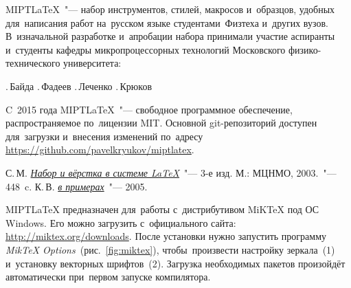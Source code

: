 \begingroup
\let\cleardoublepage\clearpage
\tableofcontents
\endgroup


MIPT\LaTeX~"--- набор инструментов, стилей, макросов и~образцов, удобных для~написания работ на~русском языке студентами~Физтеха и~других вузов.
В~изначальной разработке и~апробации набора принимали участие аспиранты и~студенты кафедры микропроцессорных технологий Московского физико-технического университета:
\begin{itemize}
    .\,Байда
    .\,Фадеев
    .\,Леченко
    .\,Крюков
\end{itemize}

C~2015 года MIPT\LaTeX~"--- свободное программное обеспечение, распространяемое по~лицензии MIT.
Основной git-репозиторий доступен для~загрузки и~внесения изменений по~адресу \url{https://github.com/pavelkryukov/miptlatex}.

\pagebreak


\begin{enumerate}[label = \arabic*.]
     С.\,М. \emph{\href{http://www.ihed.ras.ru/subsecond2007/papers/lv3ed.pdf}{Набор и вёрстка в системе \LaTeX}}~"--- 3-е изд. М.: МЦНМО, 2003.~"---448~c.
		 К.\,В. \emph{\href{http://www.ccas.ru/voron/download/voron05latex.pdf}{\LaTeXe в примерах}}~"--- 2005.
\end{enumerate}


MIPT\LaTeX{} предназначен для~работы с~дистрибутивом MiKTeX под ОС Windows.
Его можно загрузить с~официального сайта: \url{http://miktex.org/downloads}.
После установки нужно запустить программу \emph{MikTeX Options}~(рис.~\ref{fig:miktex}), чтобы~произвести настройку зеркала~(1) и~установку векторных шрифтов~(2).
Загрузка необходимых пакетов произойдёт автоматически при~первом запуске компилятора.

